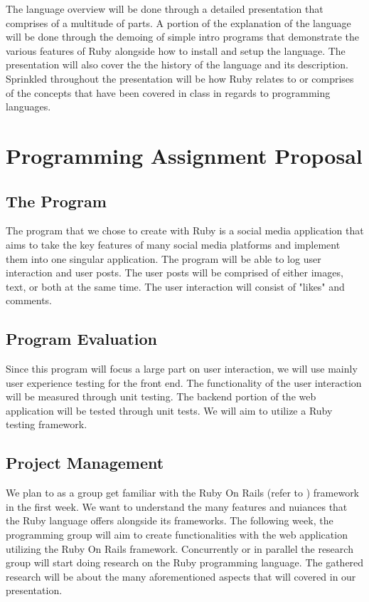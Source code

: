 \documentclass[a4paper,10pt]{article}
\begin{document}
  The language overview will be done through a detailed presentation that comprises of a multitude of parts. A portion of the explanation of the
  language will be done through the demoing of simple intro programs that demonstrate the various features of Ruby alongside how to install and setup the language.
  The presentation will also cover the the history of the language and its description. Sprinkled throughout the presentation will be how Ruby relates to or comprises of
  the concepts that have been covered in class in regards to programming languages.

  \section{Programming Assignment Proposal}
  \label{sec: programming_proposal}

  \subsection{The Program}

  The program that we chose to create with Ruby is a social media application that aims to take the key features of many social media platforms and
  implement them into one singular application. The program will be able to log user interaction and user posts. The user posts will be comprised of either
  images, text, or both at the same time. The user interaction will consist of "likes" and comments.

  \subsection{Program Evaluation}

  Since this program will focus a large part on user interaction, we will use mainly user experience testing for the front end. The functionality of the user interaction
  will be measured through unit testing. The backend portion of the web application will be tested through unit tests. We will aim to utilize a Ruby testing framework.

  \subsection{Project Management}

  We plan to as a group get familiar with the Ruby On Rails (refer to \cite{RubyOnRails}) framework in the first week. We want to understand the many features and nuiances
  that the Ruby language offers alongside its frameworks. The following week, the programming group will aim to create functionalities with the web application
  utilizing the Ruby On Rails framework. Concurrently or in parallel the research group will start doing research on the Ruby programming language.
  The gathered research will be about the many aforementioned aspects that will covered in our presentation.
\end{document}
